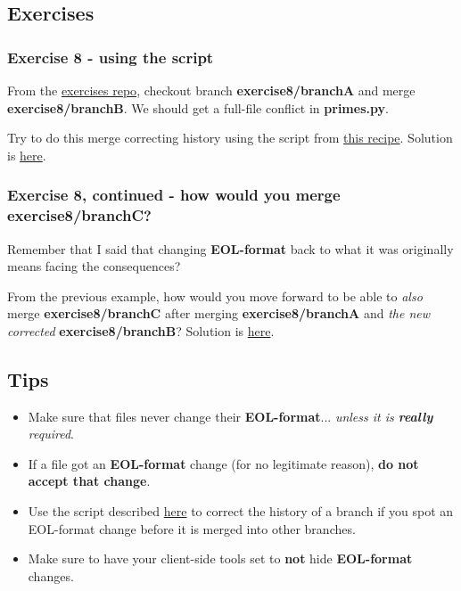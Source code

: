 \subsection{Exercises}

\subsubsection{Exercise 8 - using the script}

From the \hyperref[exercises_repo]{exercises repo}, checkout branch {\bf exercise8/branchA} and merge {\bf exercise8/branchB}. We
should get a full-file conflict in {\bf primes.py}.

Try to do this merge correcting history using the script from \hyperref[correct_eol_history]{this recipe}.
Solution is \hyperref[exercise08]{here}.

\subsubsection{Exercise 8, continued - how would you merge exercise8/branchC?}

Remember that I said that changing {\bf EOL-format} back to what it was originally means facing the consequences?

From the previous example, how would you move forward to be able to {\it also} merge {\bf exercise8/branchC} after merging
{\bf exercise8/branchA} and {\it the new corrected} {\bf exercise8/branchB}? Solution is \hyperref[exercise08_cont]{here}.

\subsection{Tips}
\begin{itemize}
	\item Make sure that files never change their {\bf EOL-format}... {\it unless it is {\bf really} required}.
	\item If a file got an {\bf EOL-format} change (for no legitimate reason), {\bf do not accept that change}.
	\item Use the script described \hyperref[correct_eol_history]{here} to correct the history of a branch if you
	spot an EOL-format change before it is merged into other branches.
	\item Make sure to have your client-side tools set to {\bf not} hide {\bf EOL-format} changes.
\end{itemize}
